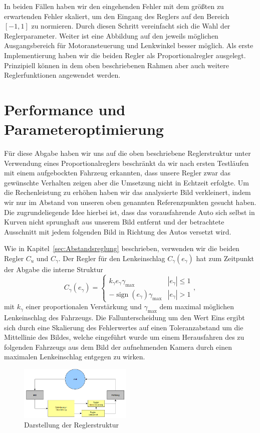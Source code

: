 \documentclass[10pt]{article}
\DeclareMathOperator{\sign}{sign}
\begin{document}
    In beiden Fällen haben wir den eingehenden Fehler mit dem größten zu erwartenden Fehler skaliert, um den Eingang des Reglers auf den Bereich $\left[-1,1\right]$ zu normieren.
    Durch diesen Schritt vereinfacht sich die Wahl der Reglerparameter.
    Weiter ist eine Abbildung auf den jeweils möglichen Ausgangsbereich für Motoransteuerung und Lenkwinkel besser möglich.
    Als erste Implementierung haben wir die beiden Regler als Proportionalregler ausgelegt.
    Prinzipiell können in dem oben beschriebenen Rahmen aber auch weitere Reglerfunktionen angewendet werden.


\section{Performance und Parameteroptimierung}
    Für diese Abgabe haben wir uns auf die oben beschriebene Reglerstruktur unter Verwendung eines Proportionalreglers beschränkt da wir nach ersten Testläufen mit einem aufgebockten Fahrzeug erkannten, dass unsere Regler zwar das gewünschte Verhalten zeigen aber die Umsetzung nicht in Echtzeit erfolgte.
    Um die Rechenleistung zu erhöhen haben wir das analysierte Bild verkleinert, indem wir nur im Abstand von unseren oben genannten Referenzpunkten gesucht haben.
    Die zugrundeliegende Idee hierbei ist, dass das vorausfahrende Auto sich selbst in Kurven nicht sprunghaft aus unserem Bild entfernt und der betrachtete Ausschnitt mit jedem folgenden Bild in Richtung des Autos versetzt wird.

    Wie in Kapitel~\ref{sec:Abstandsreglung} beschrieben, verwenden wir die beiden Regler $C_u$ und $C_{\gamma}$.
    Der Regler für den Lenkeinschlag $C_{\gamma}(e_{\gamma})$ hat zum Zeitpunkt der Abgabe die interne Struktur
    \[
    C_{\gamma}(e_{\gamma}) = \begin{cases}
        k_{\gamma}e_{\gamma}\gamma_{\max} & |e_{\gamma}| \leq 1 \\
        -\sign (e_{\gamma})\gamma_{\max}  & |e_{\gamma}| > 1
    \end{cases},
    \] mit $k_{\gamma}$ einer proportionalen Verstärkung und $\gamma_{\max}$ dem maximal möglichen Lenkeinschlag des Fahrzeugs.
    Die Fallunterscheidung um den Wert Eins ergibt sich durch eine Skalierung des Fehlerwertes auf einen Toleranzabstand um die Mittellinie des Bildes, welche eingeführt wurde um einem Herausfahren des zu folgenden Fahrzeugs aus dem Bild der aufnehmenden Kamera durch einen maximalen Lenkeinschlag entgegen zu wirken.
    \begin{figure}
        \centering
        \includegraphics[width=0.48\textwidth]{Autonomes_Fahren_Welt_Regler}
        \caption{Darstellung der Reglerstruktur}\label{fig:struktur}
    \end{figure}
\end{document}
